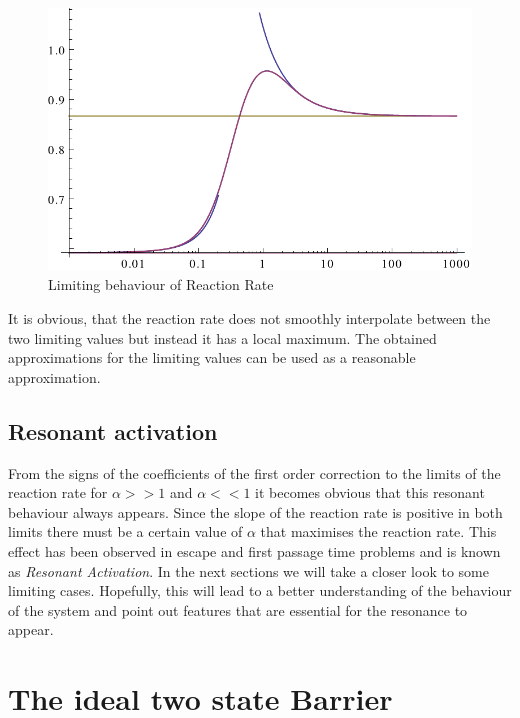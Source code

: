 \begin{figure}[H]
    \centering
    \includegraphics[width = 1 \textwidth]{plots/bothlimits.pdf}
    \caption{Limiting behaviour of Reaction Rate}
    \label{fig:rrlimit}
\end{figure}
It is obvious, that the reaction rate does not smoothly interpolate between the two limiting values but instead it has a local maximum. The obtained approximations for the limiting values can be used as a reasonable approximation.
\subsection{Resonant activation}
From the signs of the coefficients of the first order correction to the limits of the reaction rate for $\alpha>>1$ and $\alpha<<1$ it becomes obvious that this resonant behaviour always appears. Since the slope of the reaction rate is positive in both limits there must be a certain value of $\alpha$ that maximises the reaction rate. This effect has been observed in escape and first passage time problems and is known as \textit{Resonant Activation}.
In the next sections we will take a closer look to some limiting cases. Hopefully, this will lead to a better understanding of the behaviour of the system and point out features that are essential for the resonance to appear.

\section{The ideal two state Barrier}

